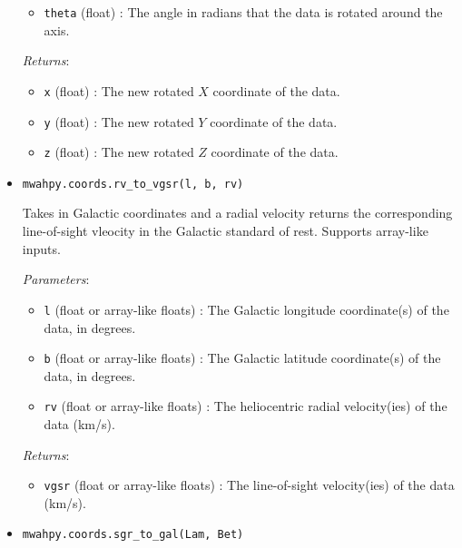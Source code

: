 \documentclass{article}
\begin{document}
\begin{itemize}
\begin{itemize}
\item \verb!theta! (float) : The angle in radians that the data is rotated around the axis. 

\end{itemize}

\textit{Returns}: \begin{itemize}

\item \verb!x! (float) : The new rotated $X$ coordinate of the data.

\item \verb!y! (float) : The new rotated $Y$ coordinate of the data.

\item \verb!z! (float) : The new rotated $Z$ coordinate of the data.

\end{itemize}



\item \verb!mwahpy.coords.rv_to_vgsr(l, b, rv)!

Takes in Galactic coordinates and a radial velocity returns the corresponding line-of-sight vleocity in the Galactic standard of rest. Supports array-like inputs.

\textit{Parameters}: \begin{itemize}

\item \verb!l! (float or array-like floats) : The Galactic longitude coordinate(s) of the data, in degrees.

\item \verb!b! (float or array-like floats) : The Galactic latitude coordinate(s) of the data, in degrees.

\item \verb!rv! (float or array-like floats) : The heliocentric radial velocity(ies) of the data (km/s).

\end{itemize}

\textit{Returns}: \begin{itemize}

\item \verb!vgsr! (float or array-like floats) : The line-of-sight velocity(ies) of the data (km/s).

\end{itemize}



\item \verb!mwahpy.coords.sgr_to_gal(Lam, Bet)!


\end{itemize}
\end{document}

